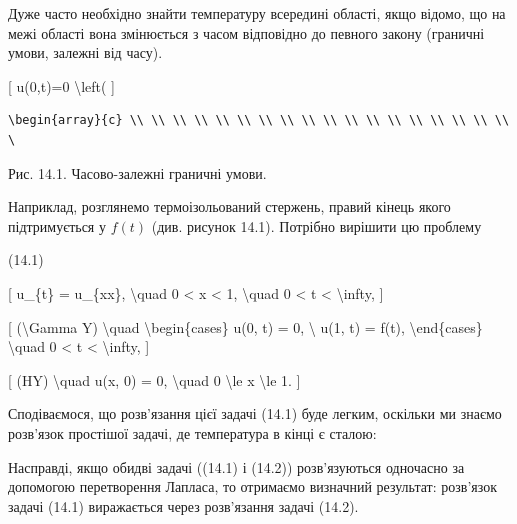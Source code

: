 \documentclass[
]{article}
\begin{document}
Дуже часто необхідно знайти температуру всередині області, якщо відомо,
що на межі області вона змінюється з часом відповідно до певного закону
(граничні умови, залежні від часу).

{[} u(0,t)=0 \textbackslash left( {]}

\begin{verbatim}
\begin{array}{c} \\ \\ \\ \\ \\ \\ \\ \\ \\ \\ \\ \\ \\ \\ \\ \\ \\ \\ \
\end{verbatim}

Рис. 14.1. Часово-залежні граничні умови.

Наприклад, розглянемо термоізольований стержень, правий кінець якого
підтримується у \(f(t)\) (див. рисунок 14.1). Потрібно вирішити цю
проблему

(14.1)

{[} u\_\{t\} = u\_\{xx\}, \textbackslash quad 0 \textless{} x
\textless{} 1, \textbackslash quad 0 \textless{} t \textless{}
\textbackslash infty, {]}

{[} (\textbackslash Gamma Y) \textbackslash quad
\textbackslash begin\{cases\} u(0, t) = 0, \textbackslash{} u(1, t) =
f(t), \textbackslash end\{cases\} \textbackslash quad 0 \textless{} t
\textless{} \textbackslash infty, {]}

{[} (HY) \textbackslash quad u(x, 0) = 0, \textbackslash quad 0
\textbackslash le x \textbackslash le 1. {]}

Сподіваємося, що розв'язання цієї задачі (14.1) буде легким, оскільки ми
знаємо розв'язок простішої задачі, де температура в кінці є сталою:

Насправді, якщо обидві задачі ((14.1) і (14.2)) розв'язуються одночасно
за допомогою перетворення Лапласа, то отримаємо визначний результат:
розв'язок задачі (14.1) виражається через розв'язання задачі (14.2).
\end{document}
